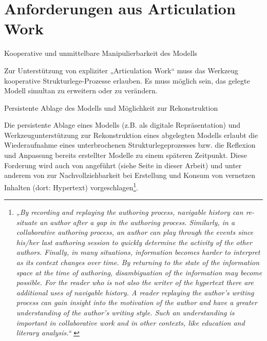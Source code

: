
\section{Anforderungen aus Articulation Work} %
\label{sec:anforderungen_aus_articulation_work}

\begin{anf}
	\label{anf:kollaborative_und_unmittelbare_manipulierbarkeit_des_modells}
	Kooperative und unmittelbare Manipulierbarkeit des Modells
\end{anf}

Zur Unterstützung von expliziter „Articulation Work“ muss das Werkzeug kooperative Strukturlege-Prozesse erlauben. Es muss möglich sein, das gelegte Modell simultan zu erweitern oder zu verändern.


\begin{anf}
	\label{anf:persistente_ablage_des_modells_möglichkeit_zur_rekonstruktion}
	Persistente Ablage des Modells und Möglichkeit zur Rekonstruktion
\end{anf}

Die persistente Ablage eines Modells (z.B. als digitale Repräsentation) und Werkzeugunterstützung zur Rekonstruktion eines abgelegten Modells erlaubt die Wiederaufnahme eines unterbrochenen Strukturlegeprozesses bzw. die Reflexion und Anpassung bereits erstellter Modelle zu einem späteren Zeitpunkt. Diese Forderung wird auch von \citet{Herrmann02} angeführt (siehe Seite \pageref{steps:herrmann} in dieser Arbeit) und unter anderem von \citet{Shipman00} zur Nachvollziehbarkeit bei Erstellung und Konsum von vernetzen Inhalten (dort: Hypertext) vorgeschlagen\footnote{\emph{„By recording and replaying the authoring process, navigable history can re-situate an author after a gap in the authoring process. Similarly, in a collaborative authoring process, an author can play through the events since his/her last authoring session to quickly determine the activity of the other authors. Finally, in many situations, information becomes harder to interpret as its context changes over time. By returning to the state of the information space at the time of authoring, disambiguation of the information may become possible. For the reader who is not also the writer of the hypertext there are additional uses of navigable history. A reader replaying the author’s writing process can gain insight into the motivation of the author and have a greater understanding of the author’s writing style. Such an understanding is important in collaborative work and in other contexts, like education and literary analysis.“} \citep{Shipman00}}.

